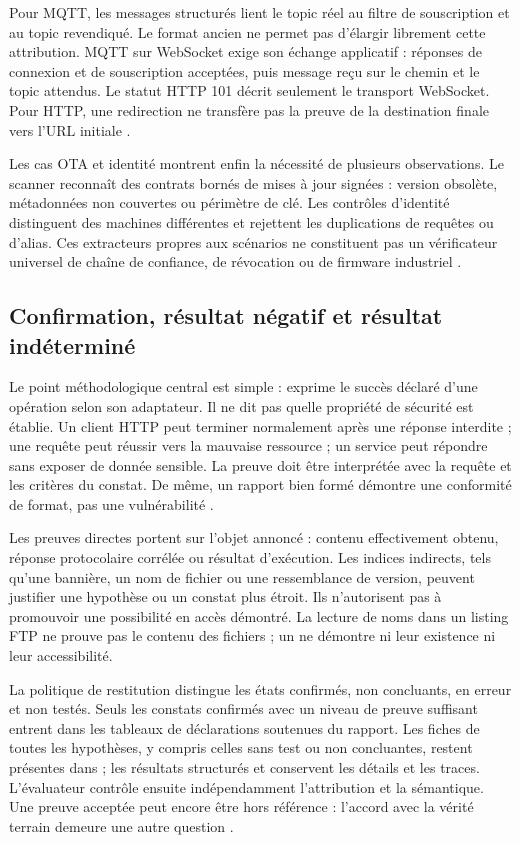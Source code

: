 \documentclass[11pt,a4paper]{article}
\DeclareRobustCommand{\code}[1]{{\small\path{#1}}}
\begin{document}
Pour MQTT, les messages structurés lient le topic réel au filtre de
souscription et au topic revendiqué. Le format ancien ne permet pas
d'élargir librement cette attribution. MQTT sur WebSocket exige son échange
applicatif : réponses de connexion et de souscription acceptées, puis message
reçu sur le chemin et le topic attendus. Le statut HTTP 101 décrit seulement
le transport WebSocket. Pour HTTP, une redirection ne transfère pas la preuve
de la destination finale vers l'URL initiale \cite{sec-mqtt,sec-evaluation}.

Les cas OTA et identité montrent enfin la nécessité de plusieurs observations.
Le scanner reconnaît des contrats bornés de mises à jour signées : version
obsolète, métadonnées non couvertes ou périmètre de clé. Les contrôles
d'identité distinguent des machines différentes et rejettent les duplications
de requêtes ou d'alias. Ces extracteurs propres aux scénarios ne constituent
pas un vérificateur universel de chaîne de confiance, de révocation ou de
firmware industriel \cite{sec-scanner,sec-tests-identite}.

\subsection{Confirmation, résultat négatif et résultat indéterminé}

Le point méthodologique central est simple : \code{success: true} exprime le
succès déclaré d'une opération selon son adaptateur. Il ne dit pas quelle
propriété de sécurité est établie. Un client HTTP peut terminer normalement
après une réponse interdite ; une requête peut réussir vers la mauvaise
ressource ; un service peut répondre sans exposer de donnée sensible. La
preuve doit être interprétée avec la requête et les critères du constat.
De même, un rapport bien formé démontre une conformité de format, pas une
vulnérabilité \cite{sec-preuves,sec-evaluation}.

Les preuves directes portent sur l'objet annoncé : contenu effectivement
obtenu, réponse protocolaire corrélée ou résultat d'exécution. Les indices
indirects, tels qu'une bannière, un nom de fichier ou une ressemblance de
version, peuvent justifier une hypothèse ou un constat plus étroit. Ils
n'autorisent pas à promouvoir une possibilité en accès démontré. La lecture
de noms dans un listing FTP ne prouve pas le contenu des fichiers ; un
\code{robots.txt} ne démontre ni leur existence ni leur accessibilité.

La politique de restitution distingue les états confirmés, non concluants,
en erreur et non testés. Seuls les constats confirmés avec un niveau de preuve
suffisant entrent dans les tableaux de déclarations soutenues du rapport.
Les fiches de toutes les hypothèses, y compris celles sans test ou non
concluantes, restent présentes dans \code{06_report.md} ; les résultats
structurés et \code{tool_calls.jsonl} conservent les détails et les traces.
L'évaluateur contrôle ensuite indépendamment l'attribution et la sémantique.
Une preuve acceptée peut
encore être hors référence : l'accord avec la vérité terrain demeure une
autre question \cite{sec-rapport,arch-rapport,sec-evaluation}.
\end{document}
